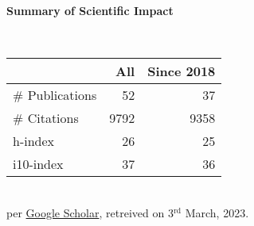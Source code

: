 \headedsection %
{\bf Summary of Scientific Impact}{}{}
{
    \qquad~~~~
    \begin{minipage}[t]{0.6\textwidth}
        \begin{tabular}{lrr}
        \hline
         & All & Since 2018\\
        \hline
        \# Publications & 52    & 37    \\
        \# Citations    & 9792  & 9358  \\
        h-index         & 26    & 25    \\
        i10-index       & 37    & 36    \\
        \hline
    \end{tabular}
    \\
    {\footnotesize{
        per \href{https://scholar.google.com/citations?user=wpLQuroAAAAJ}{Google Scholar},
        retreived on 3$^\text{rd}$ March, 2023.
        }
    }
    \end{minipage}
     
}